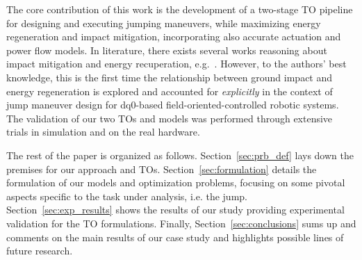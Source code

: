 The core contribution of this work is the development of a two-stage TO pipeline for designing and executing jumping maneuvers, while maximizing energy regeneration and impact mitigation, incorporating also accurate actuation and power flow models.
 In literature, there exists several works reasoning about impact mitigation and energy recuperation, e.g.~\cite{agile_bots::katz2019mini,agile_bots::hawkes2022engineered,agile_bots::chignoli2021humanoid}. However, to the authors' best knowledge, this is the first time the relationship between ground impact and energy regeneration is explored and accounted for \textit{explicitly} in the context of jump maneuver design for dq0-based field-oriented-controlled robotic systems. The validation of our two TOs and models was performed through extensive trials in simulation and on the real hardware.

The rest of the paper is organized as follows. Section~\ref{sec:prb_def} 
lays down the premises for our approach and TOs. Section~\ref{sec:formulation} details the formulation of our models and optimization problems, focusing on some pivotal aspects specific to the task under analysis, i.e. the jump. Section~\ref{sec:exp_results} shows the results of our study providing experimental validation for the TO formulations. Finally, Section~\ref{sec:conclusions} sums up and comments on the main results of our case study and highlights possible lines of future research.  
